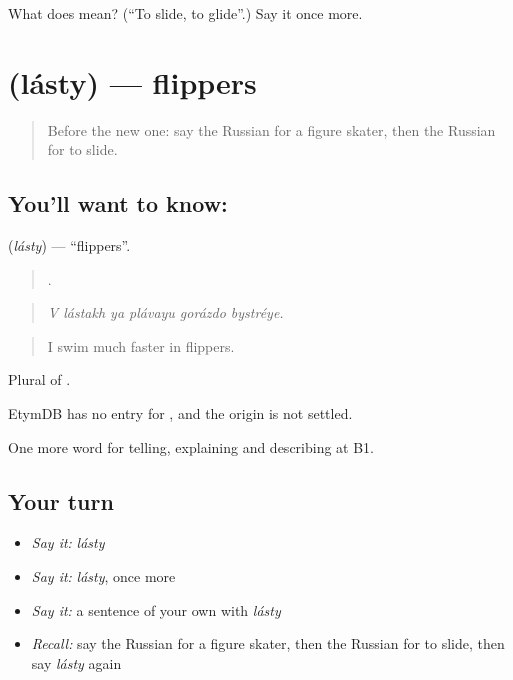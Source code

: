 \begin{tcolorbox}[breakable,colback=teal!4,colframe=teal!35!black,title={Before you move on}]
What does  mean? (\textquotedblleft{}To slide, to glide\textquotedblright{}.) Say it once more.
\end{tcolorbox}
\section[\texorpdfstring{\ru{ласты} (lásty)}{ласты (lásty)}]{ (lásty) — flippers}

\label{lesson:RU-C514-lasty}



\begin{quote}
Before the new one: say the Russian for a figure skater, then the Russian for to slide.
\end{quote}

\subsection*{You'll want to know: }
\textbf{} (\emph{lásty}) — \textquotedblleft{}flippers\textquotedblright{}.

\begin{quote}
     .
\end{quote}

\begin{quote}
\emph{V lástakh ya plávayu gorázdo bystréye.}
\end{quote}

\begin{quote}
I swim much faster in flippers.
\end{quote}

Plural of \emph{}.

\begin{cousinweb}
EtymDB has no entry for \emph{}, and the origin is not settled.
\end{cousinweb}

\begin{grammarlens}[title={What you've built}]
One more word for telling, explaining and describing at B1.
\end{grammarlens}

\subsection*{Your turn}
\begin{itemize}
\raggedright
  \item \emph{Say it:} \emph{lásty}
  \item \emph{Say it:} \emph{lásty}, once more
  \item \emph{Say it:} a sentence of your own with \emph{lásty}
  \item \emph{Recall:} say the Russian for a figure skater, then the Russian for to slide, then say \emph{lásty} again
\end{itemize}

